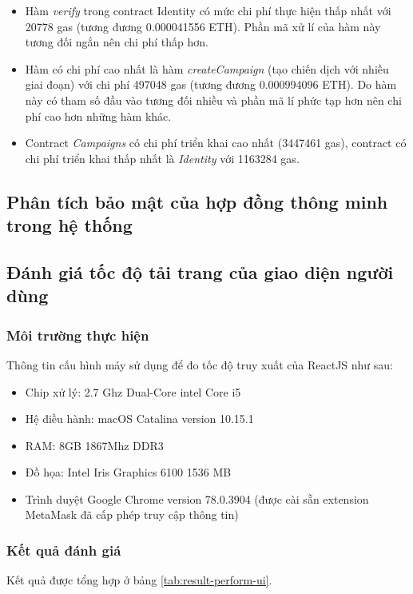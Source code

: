 \documentclass[../main-report.tex]{subfiles}
\begin{document}
\begin{itemize}
\item Hàm \textit{verify} trong contract Identity có mức chi phí thực hiện thấp nhất với 20778 gas (tương đương 0.000041556 ETH). Phần mã xử lí của hàm này tương đối ngắn nên chi phí thấp hơn.
\item Hàm có chi phí cao nhất là hàm \textit{createCampaign} (tạo chiến dịch với nhiều giai đoạn) với chi phí 497048 gas (tương đương 0.000994096 ETH). Do hàm này có tham số đầu vào tương đối nhiều và phần mã lí phức tạp hơn nên chi phí cao hơn những hàm khác.
\item Contract \textit{Campaigns} có chi phí triển khai cao nhất (3447461 gas), contract có chi phí triển khai thấp nhất là \textit{Identity} với 1163284 gas.
\end{itemize}
\subsection{Phân tích bảo mật của hợp đồng thông minh trong hệ thống}

\subsection{Đánh giá tốc độ tải trang của giao diện người dùng}
\subsubsection{Môi trường thực hiện}
Thông tin cấu hình máy sử dụng để đo tốc độ truy xuất của ReactJS như sau:

\begin{itemize}
\item Chip xử lý: 2.7 Ghz Dual-Core intel Core i5
\item Hệ điều hành: macOS Catalina version 10.15.1
\item RAM: 8GB 1867Mhz DDR3
\item Đồ họa: Intel Iris Graphics 6100 1536 MB
\item Trình duyệt Google Chrome version 78.0.3904 (được cài sẵn extension MetaMask đã cấp phép truy cập thông tin)
\end{itemize}
\subsubsection{Kết quả đánh giá}
Kết quả được tổng hợp ở bảng \ref{tab:result-perform-ui}.
\end{document}
